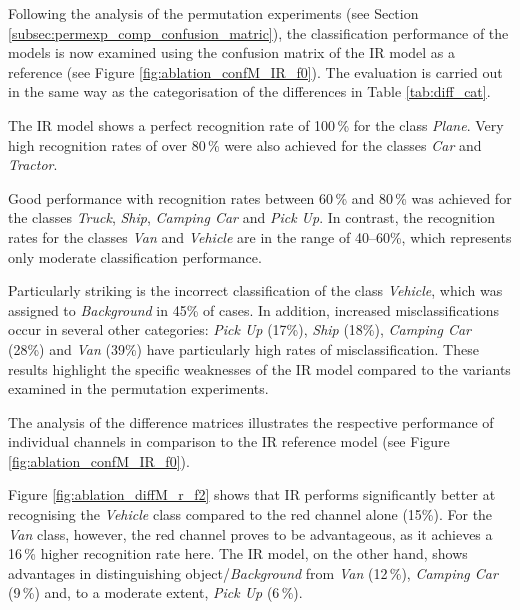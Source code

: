 Following the analysis of the permutation experiments (see Section \ref{subsec:permexp_comp_confusion_matric}), the classification performance of the models is now examined using the confusion matrix of the IR model as a reference (see Figure \ref{fig:ablation_confM_IR_f0}). The evaluation is carried out in the same way as the categorisation of the differences in Table \ref{tab:diff_cat}.  

The IR model shows a perfect recognition rate of 100\,\% for the class \textit{Plane}. Very high recognition rates of over 80\,\% were also achieved for the classes \textit{Car} and \textit{Tractor}.

Good performance with recognition rates between 60\,\% and 80\,\% was achieved for the classes \textit{Truck}, \textit{Ship}, \textit{Camping Car} and \textit{Pick Up}. In contrast, the recognition rates for the classes \textit{Van} and \textit{Vehicle} are in the range of 40–60\%, which represents only moderate classification performance. 

Particularly striking is the incorrect classification of the class \textit{Vehicle}, which was assigned to \textit{Background} in 45\% of cases. In addition, increased misclassifications occur in several other categories: \textit{Pick Up} (17\%), \textit{Ship} (18\%), \textit{Camping Car} (28\%) and \textit{Van} (39\%) have particularly high rates of misclassification. These results highlight the specific weaknesses of the IR model compared to the variants examined in the permutation experiments.
  


The analysis of the difference matrices illustrates the respective performance of individual channels in comparison to the IR reference model (see Figure \ref{fig:ablation_confM_IR_f0}).

Figure \ref{fig:ablation_diffM_r_f2} shows that IR performs significantly better at recognising the \textit{Vehicle} class compared to the red channel alone (15\%). For the \textit{Van} class, however, the red channel proves to be advantageous, as it achieves a 16\,\% higher recognition rate here. The IR model, on the other hand, shows advantages in distinguishing object/\textit{Background} from \textit{Van} (12\,\%), \textit{Camping Car} (9\,\%) and, to a moderate extent, \textit{Pick Up} (6\,\%).
    
